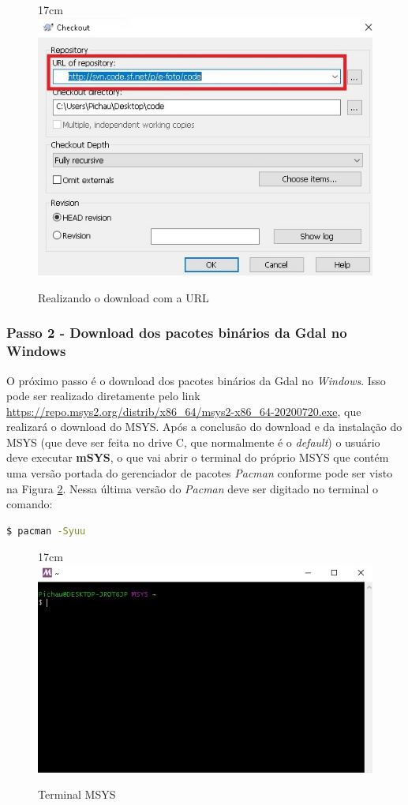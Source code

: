 \begin{figure}[!ht]{17cm}
	\centering
	\includegraphics[width=12cm]{Figuras/url.jpg}
	\caption{Realizando o download com a URL} \label{fig:url}
\end{figure}
 
\subsubsection{Passo 2 - Download dos pacotes binários da Gdal no Windows} 
O próximo passo é o download dos pacotes binários da Gdal no \textit{Windows}. Isso pode ser realizado diretamente pelo link  \url{https://repo.msys2.org/distrib/x86\_64/msys2-x86\_64-20200720.exe}, que realizará o download do MSYS. Após a conclusão do download e da instalação do MSYS (que deve ser feita no drive C, que normalmente é o \textit{default}) o usuário deve executar \textbf{mSYS}, o que vai abrir o terminal do próprio MSYS que contém uma versão portada do gerenciador de pacotes \textit{Pacman} conforme pode ser visto na Figura \ref{fig:terminalgdal}. Nessa última versão do \textit{Pacman} deve ser digitado no terminal o comando:

\begin{lstlisting}[language=bash]
$ pacman -Syuu
\end{lstlisting}
 
\begin{figure}[!ht]{17cm}
 	\centering
 	\includegraphics[width=12cm]{Figuras/terminalgdal.jpg}
 	\caption{Terminal MSYS} \label{fig:terminalgdal}
\end{figure}
 

